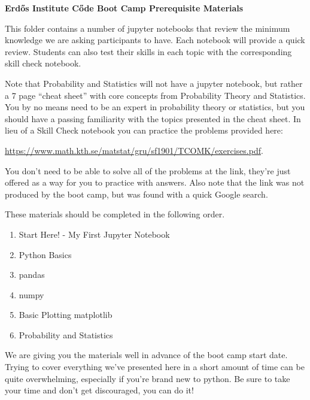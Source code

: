 \documentclass[12pt]{article}
\begin{document}
	
	\noindent
	\textbf{\Large{Erd\H{o}s} Institute C\H{o}de Boot Camp Prerequisite Materials}
	
	\vspace{4mm}
	\noindent
	This folder contains a number of jupyter notebooks that review the minimum knowledge we are asking participants to have. Each notebook will provide a quick review. Students can also test their skills in each topic with the corresponding skill check notebook.
	
	\vspace{2mm}
	\noindent
	Note that Probability and Statistics will not have a jupyter notebook, but rather a 7 page ``cheat sheet'' with core concepts from Probability Theory and Statistics. You by no means need to be an expert in probability theory or statistics, but you should have a passing familiarity with the topics presented in the cheat sheet. In lieu of a Skill Check notebook you can practice the problems provided here:
	
	\noindent
	\href{https://www.math.kth.se/matstat/gru/sf1901/TCOMK/exercises.pdf}{https://www.math.kth.se/matstat/gru/sf1901/TCOMK/exercises.pdf}. 
	
	\noindent
	You don't need to be able to solve all of the problems at the link, they're just offered as a way for you to practice with answers. Also note that the link was not produced by the boot camp, but was found with a quick Google search.
	
	\vspace{2mm}
	\noindent
	These materials should be completed in the following order.
	\begin{enumerate}
		\item Start Here! - My First Jupyter Notebook
		\item Python Basics
		\item pandas
		\item numpy
		\item Basic Plotting matplotlib
		\item Probability and Statistics
	\end{enumerate}
	
	\vspace{2mm}
	\noindent	
	We are giving you the materials well in advance of the boot camp start date. Trying to cover everything we've presented here in a short amount of time can be quite overwhelming, especially if you're brand new to python. Be sure to take your time and don't get discouraged, you can do it!
	
\end{document}
